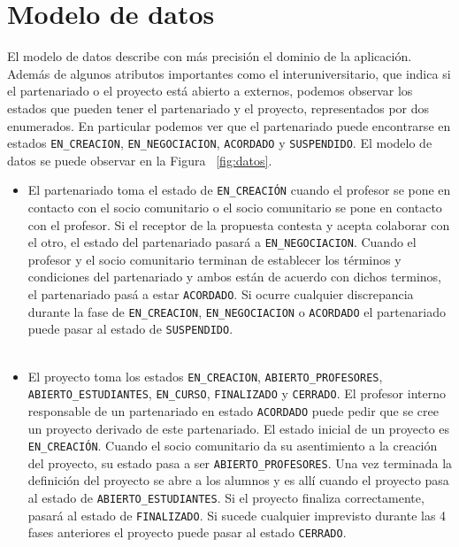 \documentclass[11pt]{book}
\begin{document}
\section{Modelo de datos}
El modelo de datos describe con más precisión el dominio de la aplicación.
Además de algunos atributos importantes como el interuniversitario, que indica si el partenariado o el proyecto está abierto a externos, podemos observar los estados que pueden tener el partenariado y el proyecto, representados por dos enumerados. En particular podemos ver que el partenariado puede encontrarse en estados \texttt{EN\_CREACION}, \texttt{EN\_NEGOCIACION}, \texttt{ACORDADO} y \texttt{SUSPENDIDO}. El modelo de datos se puede observar en la Figura ~\ref{fig:datos}.\\
\begin{itemize} 
	\item El partenariado toma el estado de \texttt{EN\_CREACIÓN} cuando el profesor se pone en contacto con el socio comunitario o el socio comunitario se pone en contacto con el profesor. Si el receptor de la propuesta contesta y acepta colaborar con el otro, el estado del partenariado pasará a \texttt{EN\_NEGOCIACION}. Cuando el profesor y el socio comunitario terminan de establecer los términos y condiciones del partenariado y ambos están de acuerdo con dichos terminos, el partenariado pasá a estar \texttt{ACORDADO}. Si ocurre cualquier discrepancia durante la fase de \texttt{EN\_CREACION}, \texttt{EN\_NEGOCIACION} o \texttt{ACORDADO} el partenariado puede pasar al estado de \texttt{SUSPENDIDO}.\\\\
	\item El proyecto toma los estados \texttt{EN\_CREACION}, \texttt{ABIERTO\_PROFESORES}, \texttt{ABIERTO\_ESTUDIANTES}, \texttt{EN\_CURSO}, \texttt{FINALIZADO} y \texttt{CERRADO}.
	El profesor interno responsable de un partenariado en estado \texttt{ACORDADO}  puede pedir que se cree un proyecto derivado de este partenariado. El
	estado inicial de un proyecto es \texttt{EN\_CREACIÓN}. Cuando el socio
	comunitario da su asentimiento a la creación del proyecto, su estado
	pasa a ser \texttt{ABIERTO\_PROFESORES}. Una vez terminada la definición del proyecto se abre a los alumnos y es allí cuando el proyecto pasa al estado de \texttt{ABIERTO\_ESTUDIANTES}. Si el proyecto finaliza correctamente, pasará al estado de \texttt{FINALIZADO}. Si sucede cualquier imprevisto durante las 4 fases anteriores el proyecto puede pasar al estado \texttt{CERRADO}.
\end{itemize} 
\end{document}
